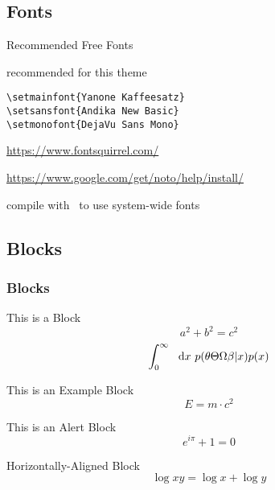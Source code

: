 \documentclass[compress, aspectratio=169]{beamer}
\begin{document}
\subsection{Fonts}

\begin{frame}[fragile]{Recommended Free Fonts}
  \begin{description}
  \item[Selected Fonts] recommended for this theme\\
    \begin{lstlisting}[basicstyle = \ttfamily\small]
\setmainfont{Yanone Kaffeesatz}
\setsansfont{Andika New Basic}
\setmonofont{DejaVu Sans Mono}
    \end{lstlisting}
  \item[Download] {\small \url{https://www.fontsquirrel.com/}}
  \item[Install Fonts] {\small \url{https://www.google.com/get/noto/help/install/}}
  \item[Compilation] compile with \XeLaTeX~to use system-wide fonts
  \end{description}

\end{frame}


\subsection{Blocks}

\begin{frame}
  \frametitle{Blocks}
  \begin{block}{This is a Block}
    \[
      a^2 + b^2 = c^2
    \]
    $$\int_0^{\infty}~~ {\rm d}x~  p(\theta \Theta \Omega \beta| x) p(x)$$
  \end{block}
  \begin{exampleblock}{This is an Example Block}
    \[
      E = m \cdot c^{2}
    \]
  \end{exampleblock}
  \begin{alertblock}{This is an Alert Block}
    \[
      e^{i\pi} + 1 = 0
    \]
  \end{alertblock}

  \centering
  \begin{minipage}{1.0\linewidth}
    \begin{block}{Horizontally-Aligned Block}
      \[
        \log xy = \log x + \log y
      \]
    \end{block}
  \end{minipage}
\end{frame}
\end{document}

